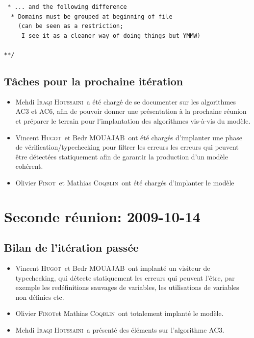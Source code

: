\documentclass[a4paper,12pt]{article}
\def\familyname{\textsc}
\def\firstname#1{#1}
\def\groupmember#1#2{\firstname{#1} \familyname{#2}}
\def\mmat{\groupmember{Mathias}{Coqblin}}
\def\moli{\groupmember{Olivier}{Finot}}
\def\mvin{\groupmember{Vincent}{Hugot}}
\def\mmed{\groupmember{Mehdi}{Iraqi Houssaini}}
\def\mbed{\groupmember{Bedr}{MOUAJAB}}
\begin{document}
\begin{itemize}
\begin{verbatim}
 * ... and the following difference
  * Domains must be grouped at beginning of file
    (can be seen as a restriction; 
     I see it as a cleaner way of doing things but YMMW)
  
**/
\end{verbatim}
\end{itemize}



\subsection{Tâches pour la prochaine itération}

\begin{itemize}
 \item \mmed\ a été chargé de se documenter sur les algorithmes AC3 et AC6,
afin de pouvoir donner une présentation à la prochaine réunion et
préparer le terrain pour l'implantation des algorithmes vis-à-vis du 
modèle.
\item \mvin\ et \mbed\ ont été chargés d'implanter une phase de 
 vérification/typechecking pour filtrer les erreurs
 les erreurs qui peuvent être détectées statiquement afin
 de garantir la production d'un modèle cohérent.
\item \moli\ et \mmat\ ont été chargés d'implanter le modèle
\end{itemize}








\section{Seconde réunion: 2009-10-14}

\subsection{Bilan de l'itération passée}

\begin{itemize}
 \item \mvin\ et \mbed\ ont implanté un visiteur de typechecking, 
  qui détecte statiquement les erreurs qui peuvent l'être, 
  par exemple les redéfinitions sauvages de variables, les utilisations
  de variables non définies etc. 
\item \moli et \mmat\ ont totalement implanté le modèle.
\item \mmed\ a présenté des éléments sur l'algorithme AC3.
\end{itemize}
\end{document}
